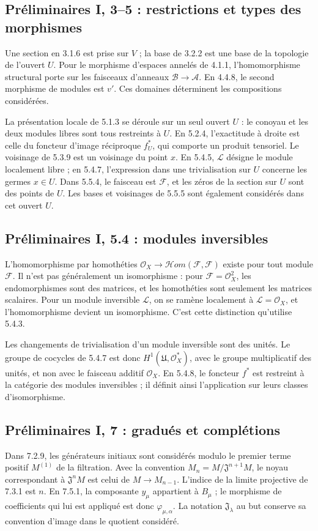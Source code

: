 \subsection{Préliminaires I, 3--5 : restrictions et types des morphismes}
\label{note:base0-sheaves}
Une section en 3.1.6 est prise sur $V$ ; la base de 3.2.2 est une base
de la topologie de l'ouvert $U$. Pour le morphisme d'espaces annelés de
4.1.1, l'homomorphisme structural porte sur les faisceaux d'anneaux
$\mathcal B\to\mathcal A$. En 4.4.8, le second morphisme de modules
est $v'$. Ces domaines déterminent les compositions considérées.

La présentation locale de 5.1.3 se déroule sur un seul ouvert $U$ :
le conoyau et les deux modules libres sont tous restreints à $U$.
En 5.2.4, l'exactitude à droite est celle du foncteur d'image réciproque
$f_U^*$, qui comporte un produit tensoriel. Le voisinage de 5.3.9
est un voisinage du point $x$.
En 5.4.5, $\mathcal L$ désigne le module localement libre ; en 5.4.7,
l'expression dans une trivialisation sur $U$ concerne les germes $x\in U$.
Dans 5.5.4, le faisceau est $\mathcal F$, et les zéros de la section sur
$U$ sont des points de $U$. Les bases et voisinages de 5.5.5 sont
également considérés dans cet ouvert $U$.

\subsection{Préliminaires I, 5.4 : modules inversibles}
\label{note:base0-invertible}
L'homomorphisme par homothéties
$\mathcal O_X\to\mathcal H\!om(\mathcal F,\mathcal F)$ existe pour
tout module $\mathcal F$. Il n'est pas généralement un isomorphisme :
pour $\mathcal F=\mathcal O_X^2$, les endomorphismes sont des matrices,
et les homothéties sont seulement les matrices scalaires.
Pour un module inversible $\mathcal L$, on se ramène localement à
$\mathcal L=\mathcal O_X$, et l'homomorphisme devient un isomorphisme.
C'est cette distinction qu'utilise 5.4.3.

Les changements de trivialisation d'un module inversible sont des
unités. Le groupe de cocycles de 5.4.7 est donc
$H^1(\mathfrak U,\mathcal O_X^*)$, avec le groupe multiplicatif des
unités, et non avec le faisceau additif $\mathcal O_X$.
En 5.4.8, le foncteur $f^*$ est restreint à la catégorie des modules
inversibles ; il définit ainsi l'application sur leurs classes
d'isomorphisme.

\subsection{Préliminaires I, 7 : gradués et complétions}
\label{note:base0-completion}
Dans 7.2.9, les générateurs initiaux sont considérés modulo le premier
terme positif $M^{(1)}$ de la filtration. Avec la convention
$M_n=M/\mathfrak J^{n+1}M$, le noyau correspondant à
$\mathfrak J^nM$ est celui de $M\to M_{n-1}$.
L'indice de la limite projective de 7.3.1 est $n$.
En 7.5.1, la composante $y_\mu$ appartient à $B_\mu$ ; le morphisme
de coefficients qui lui est appliqué est donc $\varphi_{\mu,\alpha}$.
La notation $\mathfrak J_\lambda$ au but conserve sa convention
d'image dans le quotient considéré.

